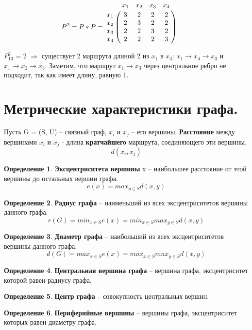 \documentclass[12pt, a4paper, oneside]{article}
\theoremstyle{plain} %
\theoremstyle{definition}
\newtheorem*{definition}{Определение}  %
\newcommand{\indef}[1]{\textbf{ \color{dark_red} #1}}
\begin{document}
\[
P^2 = P*P =
 \bordermatrix{ & x_1 & x_2 & x_3 & x_4   \cr
  x_1 & 3 & 2 & 2 & 2 \cr
  x_2 & 2 & 3 & 2 & 2 \cr
  x_3 & 2 & 2 & 3 & 2 \cr
  x_4 & 2 & 2 & 2 & 3 \cr
    } \qquad
\]

$P_{13}^2$ = 2 $\Rightarrow$ существует 2 маршрута длиной 2 из $x_1$ в $x_3$: $x_1\rightarrow x_4\rightarrow x_3$ и $x_1\rightarrow x_2\rightarrow x_3$. Заметим, что маршрут $x_1\rightarrow x_3$ через центральное ребро не подходит, так как имеет длину, равную 1.

\section{Метрические характеристики графа.}

Пусть G = (S, U) – связный граф, $x_i$ и $x_j$ -- его вершины.
\indef{Расстояние} между вершинами $x_i$ и $x_j$ - длина \textbf{кратчайшего} маршрута, соединяющего эти вершины.
\[ d(x_i,x_j) \]

\begin{definition}
\indef{Эксцентриситета вершины} x – наибольшее расстояние от этой вершины до остальных вершин графа. \[e(x) = max_{y \in S} d(x,y) \]
\end{definition}

\begin{definition}
\indef{Радиус графа} – наименьший из всех эксцентриситетов вершины данного графа.
\[ r(G) = min_{x\in S}e(x) = min_{x \in S} max_{y \in S} d(x,y)  \]
\end{definition}

\begin{definition}
\indef{Диаметр графа} – наибольший из всех эксцентриситетов вершины  данного графа.
\[ d(G) = max_{x\in S}e(x) = max_{x \in S} max_{y \in S} d(x,y) \]
\end{definition}

\begin{definition}
\indef{Центральная вершина графа} – вершина графа, эксцентриситет которой равен радиусу графа.
\end{definition}

\begin{definition}
\indef{Центр графа} – совокупность центральных вершин.
\end{definition}

\begin{definition}
\indef{Периферийные вершины} – вершины графа, эксцентриситет которых равен диаметру графа.
\end{definition}
\end{document}
